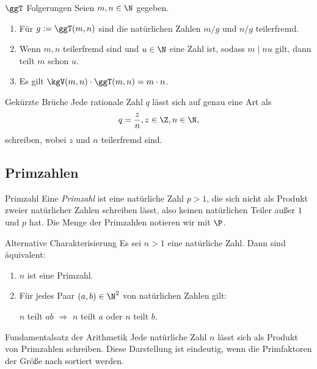 \begin{karte}{\(\ggT\) Folgerungen}
    Seien \(m,n\in\N\) gegeben.
    \begin{enumerate}
        \item Für \(g:= \ggT(m,n)\) sind die natürlichen Zahlen \(m/g\) und \(n/g\) teilerfremd.
        \item Wenn \(m,n\) teilerfremd sind und \(u\in \N\) eine Zahl ist, sodass \(m\;|\; nu\) gilt, 
        dann teilt \(m\) schon \(u\).
        \item Es gilt \(\kgV(m,n) \cdot \ggT(m,n) = m\cdot n\).
    \end{enumerate}
\end{karte}

\begin{karte}{Gekürzte Brüche}
    Jede rationale Zahl \(q\) lässt sich auf genau eine Art als 
    \[ q=\frac{z}{n}, z\in \Z, n\in \N, \]
    schreiben, wobei \(z\) und \(n\) teilerfremd sind.
\end{karte}

\subsection{Primzahlen}

\begin{karte}{Primzahl}
    Eine \textit{Primzahl} ist eine natürliche Zahl \(p>1\), die 
    sich nicht als Produkt zweier natürlicher Zahlen schreiben lässt, 
    also keinen natürlichen Teiler außer \(1\) und \(p\) hat. 
    Die Menge der Primzahlen notieren wir mit \(\P\).
\end{karte}

\begin{karte}{Alternative Charakterisierung}
    Es sei \(n>1\) eine natürliche Zahl. Dann sind äquivalent: 
    \begin{enumerate}
        \item \(n\) ist eine Primzahl.
        \item Für jedes Paar \((a,b)\in \N^2\) von natürlichen Zahlen gilt:
        \begin{center}
            \(n\) teilt \(ab\) \(\Rightarrow\) \(n\) teilt \(a\) oder \(n\) teilt \(b\).
        \end{center}
    \end{enumerate}
\end{karte}

\begin{karte}{Fundamentalsatz der Arithmetik}
    Jede natürliche Zahl \(n\) lässt sich als Produkt von Primzahlen schreiben. 
    Diese Darstellung ist eindeutig, wenn die Primfaktoren der Größe nach sortiert werden.
\end{karte}

